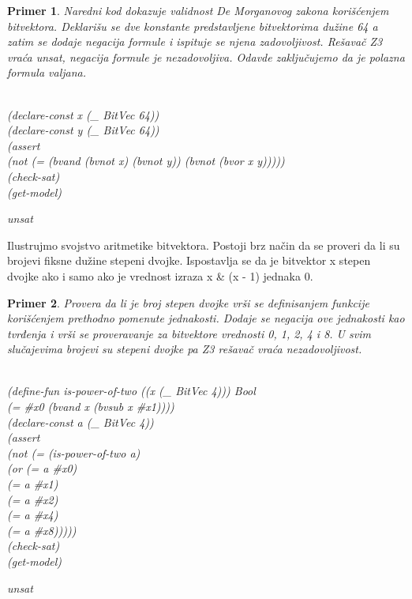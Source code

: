\documentclass[12pt,oneside]{memoir}
\newtheorem{primer}{Primer}
\begin{document}
\begin{primer} Naredni kod dokazuje validnost De Morganovog zakona korišćenjem bitvektora. Deklarišu se dve konstante predstavljene bitvektorima dužine 64 a zatim se dodaje negacija formule i ispituje se njena zadovoljivost. Rešavač Z3 vraća unsat, negacija formule je nezadovoljiva.
Odavde zaključujemo da je polazna formula valjana.
\\ \\
\hspace{9.5cm}
\begin{minipage}[t]{0.5\textwidth}
(declare-const x (\_ BitVec 64))
\\(declare-const y (\_ BitVec 64))
\\(assert 
\\(not (= (bvand (bvnot x) (bvnot y)) (bvnot (bvor x y)))))
\\(check-sat)
\\(get-model)
\end{minipage}
\hspace{2.5cm}
\begin{minipage}[b]{0.5\textwidth}
unsat
\end{minipage}
\end{primer}


Ilustrujmo svojstvo aritmetike bitvektora. Postoji brz način da se proveri da li su brojevi fiksne dužine stepeni dvojke. 
Ispostavlja se da je bitvektor x stepen dvojke ako i samo ako je vrednost izraza
x \& (x - 1) jednaka 0.
\begin{primer} Provera da li je broj stepen dvojke vrši se definisanjem funkcije korišćenjem prethodno pomenute jednakosti. Dodaje se negacija ove jednakosti kao tvrđenja i vrši se proveravanje za bitvektore vrednosti 0, 1, 2, 4 i 8. U svim slučajevima brojevi su stepeni dvojke pa Z3 rešavač vraća nezadovoljivost.\\ \\
\begin{minipage}[t]{0.5\textwidth}
(define-fun is-power-of-two ((x (\_ BitVec 4))) Bool 
\\  (= \#x0 (bvand x (bvsub x \#x1))))
\\(declare-const a (\_ BitVec 4))
\\(assert 
\\ (not (= (is-power-of-two a) 
\\         (or (= a \#x0) 
\\             (= a \#x1) 
\\             (= a \#x2) 
\\             (= a \#x4) 
\\             (= a \#x8)))))
\\(check-sat)
\\(get-model)
\end{minipage}
\hspace{2.5cm}
\begin{minipage}[b]{0.5\textwidth}
unsat
\end{minipage}
\end{primer}
\vspace{0.5cm}
\end{document}
